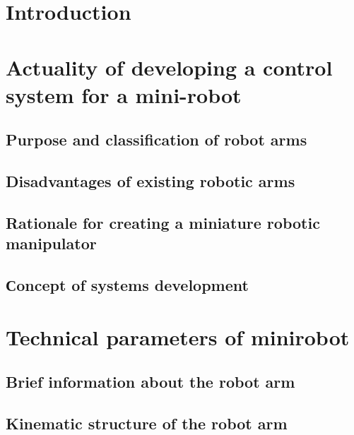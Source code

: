 
\section*{Introduction}


\section{ Actuality of developing a control system for a mini-robot}


\subsection{Purpose and classification of robot arms} 



\subsection{Disadvantages of existing robotic arms}


\subsection{Rationale for creating a miniature robotic manipulator}


\subsection{Сoncept of systems development}


\section{Technical parameters of minirobot}
\subsection{Brief information about the robot arm} 

\subsection{Kinematic structure of the robot arm}  


